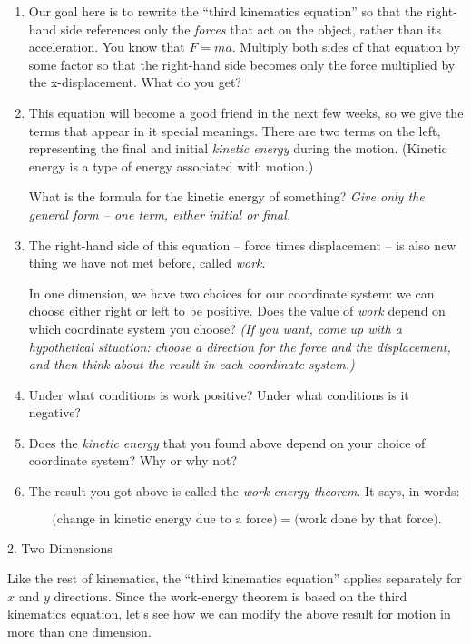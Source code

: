 \documentclass[12pt]{article}
\begin{document}
\begin{enumerate}
	\item Our goal here is to rewrite the ``third kinematics equation'' so that the right-hand side references only the {\it forces} that act on the object, rather than its acceleration. You know that $F=ma$. Multiply both sides of that equation by some factor so that the right-hand side becomes only the force multiplied by the x-displacement. What do you get?
	
	\item This equation will become a good friend in the next few weeks, so we give the terms that appear in it special meanings. There are two terms on the left, representing the final and initial {\it kinetic energy} during the motion. (Kinetic energy is a type of energy associated with motion.)
	
	What is the formula for the kinetic energy of something? {\it Give only the general form -- one term, either initial or final.}
	
	\item The right-hand side of this equation -- force times displacement -- is also new thing we have not met before, called {\it work}. 
	
	In one dimension, we have two choices for our coordinate system: we can choose either right or left to be positive. Does the value of {\it work} depend on which coordinate system you choose? {\it (If you want, come up with a hypothetical situation: choose a direction for the force and the displacement, and then think about the result in each coordinate system.)}
	
	\item Under what conditions is work positive? Under what conditions is it negative?
	
	\item Does the {\it kinetic energy} that you found above depend on your choice of coordinate system? Why or why not?
	
	\item The result you got above is called the {\it work-energy theorem}. It says, in words:
	
	$$\text{(change in kinetic energy due to a force)} = \text{(work done by that force)}.$$
\end{enumerate}

\newpage

2. Two Dimensions

 Like the rest of kinematics, the ``third kinematics equation'' applies separately for $x$ and $y$ directions. Since the work-energy theorem is based on the third kinematics equation, let's see how we can modify the above result for motion in more than one dimension.
\end{document}
